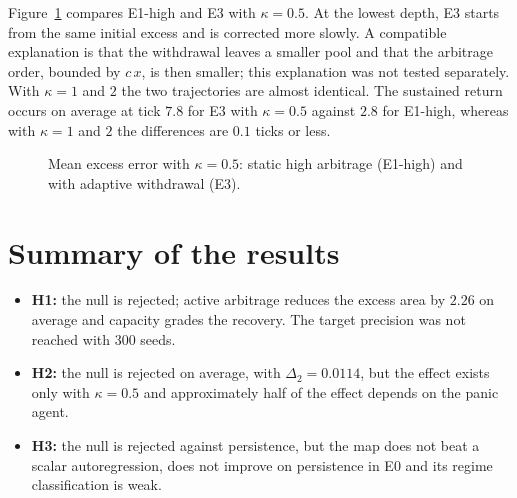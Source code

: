 Figure~\ref{fig:prof} compares E1-high and E3 with $\kappa=0.5$. At the lowest depth, E3 starts from the same initial excess and is corrected more slowly. A compatible explanation is that the withdrawal leaves a smaller pool and that the arbitrage order, bounded by $c\,x$, is then smaller; this explanation was not tested separately. With $\kappa=1$ and $2$ the two trajectories are almost identical. The sustained return occurs on average at tick $7.8$ for E3 with $\kappa=0.5$ against $2.8$ for E1-high, whereas with $\kappa=1$ and $2$ the differences are $0.1$ ticks or less.

\begin{figure}[htbp]
\centering
{}
\caption{Mean excess error with $\kappa=0.5$: static high arbitrage (E1-high) and with adaptive withdrawal (E3).}
\label{fig:prof}
\end{figure}

\section{Summary of the results}

\begin{itemize}
  \item \textbf{H1:} the null is rejected; active arbitrage reduces the excess area by $2.26$ on average and capacity grades the recovery. The target precision was not reached with 300 seeds.
  \item \textbf{H2:} the null is rejected on average, with $\Delta_2=0.0114$, but the effect exists only with $\kappa=0.5$ and approximately half of the effect depends on the panic agent.
  \item \textbf{H3:} the null is rejected against persistence, but the map does not beat a scalar autoregression, does not improve on persistence in E0 and its regime classification is weak.
\end{itemize}
